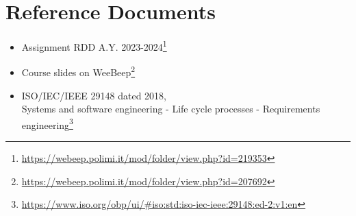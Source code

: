 \section{Reference Documents}
\begin{itemize}
    \item Assignment RDD A.Y. 2023-2024\footnote{\url{https://webeep.polimi.it/mod/folder/view.php?id=219353}}
    \item Course slides on WeeBeep\footnote{\url{https://webeep.polimi.it/mod/folder/view.php?id=207692}}
    \item ISO/IEC/IEEE 29148 dated 2018, \\
          Systems and software engineering - Life cycle processes - Requirements engineering\footnote{\url{https://www.iso.org/obp/ui/\#iso:std:iso-iec-ieee:29148:ed-2:v1:en}}
\end{itemize}

\newpage

